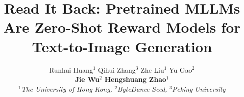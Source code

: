 \documentclass{article}
\title{Read It Back: Pretrained MLLMs Are Zero-Shot Reward Models for Text-to-Image Generation}
\author{
  Runhui Huang$^{1}$ \quad 
  Qihui Zhang$^{3}$\quad
  Zhe Liu$^{1}$\quad
  Yu Gao$^{2}$\quad \\
  \textbf{Jie Wu}$^{2}$\quad
  \textbf{Hengshuang Zhao}$^{1}$  \\
 \textit{$^{1}$The University of Hong Kong, $^{2}$ByteDance Seed, $^{3}$Peking University}
}
\theoremstyle{plain}
\theoremstyle{definition}
\theoremstyle{remark}
\begin{document}
\maketitle

\renewcommand{\subsectionautorefname}{Section}
\renewcommand{\sectionautorefname}{Section}












\newpage
\appendix


% 
\end{document}
